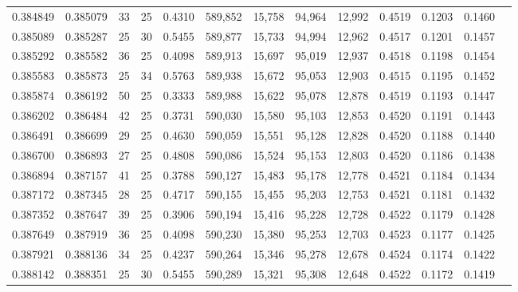 \begin{tabular}{rrrrrrrrrrrrr}
0.384849 & 0.385079 &    33 &  25 &                                     0.4310 & 589,852 &  15,758 &  94,964 &  12,992 & 0.4519 & 0.1203 & 0.1460 \\
0.385089 & 0.385287 &    25 &  30 &                                     0.5455 & 589,877 &  15,733 &  94,994 &  12,962 & 0.4517 & 0.1201 & 0.1457 \\
0.385292 & 0.385582 &    36 &  25 &                                     0.4098 & 589,913 &  15,697 &  95,019 &  12,937 & 0.4518 & 0.1198 & 0.1454 \\
0.385583 & 0.385873 &    25 &  34 &                                     0.5763 & 589,938 &  15,672 &  95,053 &  12,903 & 0.4515 & 0.1195 & 0.1452 \\
0.385874 & 0.386192 &    50 &  25 &                                     0.3333 & 589,988 &  15,622 &  95,078 &  12,878 & 0.4519 & 0.1193 & 0.1447 \\
0.386202 & 0.386484 &    42 &  25 &                                     0.3731 & 590,030 &  15,580 &  95,103 &  12,853 & 0.4520 & 0.1191 & 0.1443 \\
0.386491 & 0.386699 &    29 &  25 &                                     0.4630 & 590,059 &  15,551 &  95,128 &  12,828 & 0.4520 & 0.1188 & 0.1440 \\
0.386700 & 0.386893 &    27 &  25 &                                     0.4808 & 590,086 &  15,524 &  95,153 &  12,803 & 0.4520 & 0.1186 & 0.1438 \\
0.386894 & 0.387157 &    41 &  25 &                                     0.3788 & 590,127 &  15,483 &  95,178 &  12,778 & 0.4521 & 0.1184 & 0.1434 \\
0.387172 & 0.387345 &    28 &  25 &                                     0.4717 & 590,155 &  15,455 &  95,203 &  12,753 & 0.4521 & 0.1181 & 0.1432 \\
0.387352 & 0.387647 &    39 &  25 &                                     0.3906 & 590,194 &  15,416 &  95,228 &  12,728 & 0.4522 & 0.1179 & 0.1428 \\
0.387649 & 0.387919 &    36 &  25 &                                     0.4098 & 590,230 &  15,380 &  95,253 &  12,703 & 0.4523 & 0.1177 & 0.1425 \\
0.387921 & 0.388136 &    34 &  25 &                                     0.4237 & 590,264 &  15,346 &  95,278 &  12,678 & 0.4524 & 0.1174 & 0.1422 \\
0.388142 & 0.388351 &    25 &  30 &                                     0.5455 & 590,289 &  15,321 &  95,308 &  12,648 & 0.4522 & 0.1172 & 0.1419 \\

\end{tabular}
